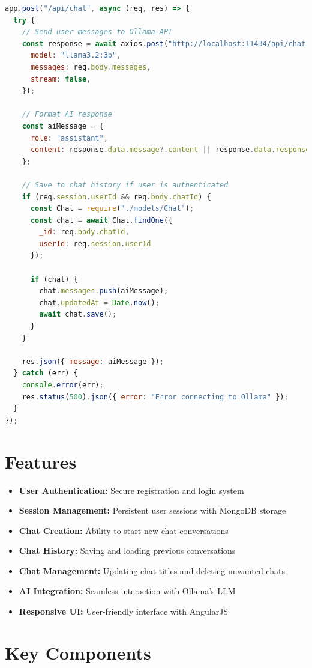 \documentclass[12pt,a4paper]{article}
\begin{document}
\begin{lstlisting}[language=JavaScript]
app.post("/api/chat", async (req, res) => {
  try {
    // Send user messages to Ollama API
    const response = await axios.post("http://localhost:11434/api/chat", {
      model: "llama3.2:3b",
      messages: req.body.messages,
      stream: false,
    });

    // Format AI response
    const aiMessage = {
      role: "assistant",
      content: response.data.message?.content || response.data.response,
    };

    // Save to chat history if user is authenticated
    if (req.session.userId && req.body.chatId) {
      const Chat = require("./models/Chat");
      const chat = await Chat.findOne({
        _id: req.body.chatId,
        userId: req.session.userId
      });

      if (chat) {
        chat.messages.push(aiMessage);
        chat.updatedAt = Date.now();
        await chat.save();
      }
    }

    res.json({ message: aiMessage });
  } catch (err) {
    console.error(err);
    res.status(500).json({ error: "Error connecting to Ollama" });
  }
});
\end{lstlisting}

\section{Features}
\begin{itemize}
\item \textbf{User Authentication:} Secure registration and login system
\item \textbf{Session Management:} Persistent user sessions with MongoDB storage
\item \textbf{Chat Creation:} Ability to start new chat conversations
\item \textbf{Chat History:} Saving and loading previous conversations
\item \textbf{Chat Management:} Updating chat titles and deleting unwanted chats
\item \textbf{AI Integration:} Seamless interaction with Ollama's LLM
\item \textbf{Responsive UI:} User-friendly interface with AngularJS
\end{itemize}

\section{Key Components}
\end{document}
